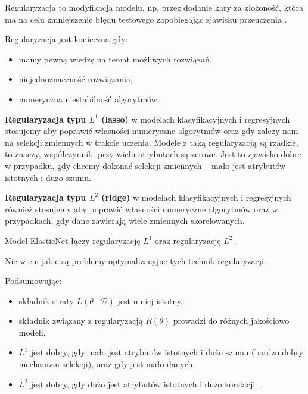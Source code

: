 \documentclass[wi]{zut}
\begin{document}
Regularyzacja to modyfikacja modelu, np. przez dodanie kary za złożoność, która ma na celu zmniejszenie błędu testowego zapobiegając zjawisku przeuczenia \cite{wiki:Regularization}.

Regularyzacja jest konieczna gdy:

\begin{itemize}
    \item mamy pewną wiedzę na temat możliwych rozwiązań,
    \item niejednoznaczność rozwiązania,
    \item numeryczna niestabilność algorytmów \cite{Korzen2020_12}.
\end{itemize}
\question

\textbf{Regularyzacja typu $L^1$ (lasso)} w modelach klasyfikacyjnych i regresyjnych stosujemy aby poprawić własności numeryczne algorytmów oraz gdy zależy nam na selekcji zmiennych w trakcie uczenia. Modele z taką regularyzacją są rzadkie, to znaczy, współczynniki przy wielu atrybutach są zerowe. Jest to zjawisko dobre w przypadku, gdy chcemy dokonać selekcji zmiennych -- mało jest atrybutów istotnych i dużo szumu.

\textbf{Regularyzacja typu $L^2$ (ridge)} w modelach klasyfikacyjnych i regresyjnych również stosujemy aby poprawić własności numeryczne algorytmów oraz w przypadkach, gdy dane zawierają wiele zmiennych skorelowanych.

Model ElasticNet łączy regularyzację $L^1$ oraz regularyzację $L^2$ \cite{wiki:Elastic_net_regularization}. 

Nie wiem jakie są problemy optymalizacyjne tych technik regularyzacji.
\question

Podsumowując:

\begin{itemize}
    \item składnik straty $L(\theta \mid \mathscr{D})$ jest mniej istotny,
    \item składnik związany z regularyzacją $R(\theta)$ prowadzi do różnych jakościowo modeli,
    \item $L^1$ jest dobry, gdy mało jest atrybutów istotnych i dużo szumu (bardzo dobry mechanizm selekcji), oraz gdy jest mało danych,
    \item $L^2$ jest dobry, gdy dużo jest atrybutów istotnych i dużo korelacji \cite{Korzen2020_12}.
\end{itemize}

\printbibliography[heading=bibintoc]

\appendix
\end{document}
